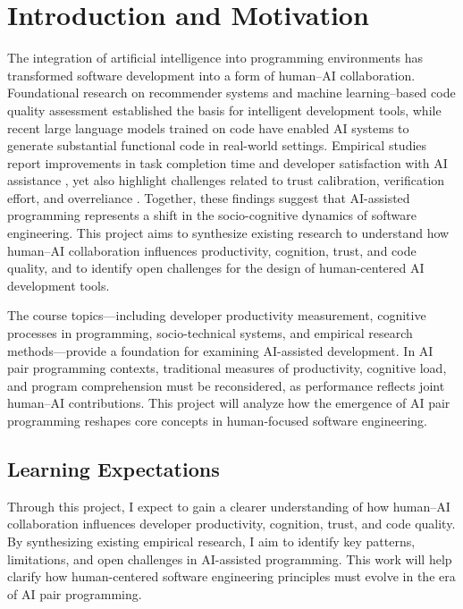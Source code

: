 \section*{Introduction and Motivation}
The integration of artificial intelligence into programming environments has transformed software development into a form of human–AI collaboration. Foundational research on recommender systems \cite{robillard2014recommender} and machine learning–based code quality assessment \cite{buseweimer2010learning} established the basis for intelligent development tools, while recent large language models trained on code \cite{chen2021evaluatingllm} have enabled AI systems to generate substantial functional code in real-world settings. Empirical studies report improvements in task completion time and developer satisfaction with AI assistance \cite{zeigler2022productivity,peng2023copilot}, yet also highlight challenges related to trust calibration, verification effort, and overreliance \cite{vaithilingam2022expectations}. Together, these findings suggest that AI-assisted programming represents a shift in the socio-cognitive dynamics of software engineering. This project aims to synthesize existing research to understand how human–AI collaboration influences productivity, cognition, trust, and code quality, and to identify open challenges for the design of human-centered AI development tools.

The course topics—including developer productivity measurement, cognitive processes in programming, socio-technical systems, and empirical research methods—provide a foundation for examining AI-assisted development. In AI pair programming contexts, traditional measures of productivity, cognitive load, and program comprehension must be reconsidered, as performance reflects joint human–AI contributions. This project will analyze how the emergence of AI pair programming reshapes core concepts in human-focused software engineering.

\subsection*{Learning Expectations}
Through this project, I expect to gain a clearer understanding of how human–AI collaboration influences developer productivity, cognition, trust, and code quality. By synthesizing existing empirical research, I aim to identify key patterns, limitations, and open challenges in AI-assisted programming. This work will help clarify how human-centered software engineering principles must evolve in the era of AI pair programming.


